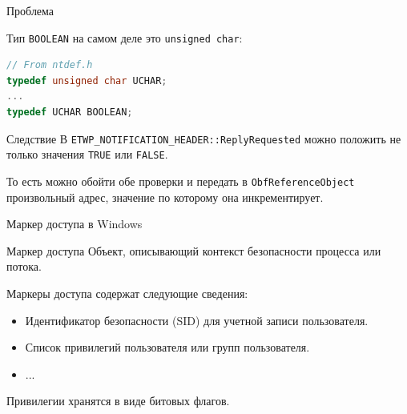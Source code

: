 \documentclass{beamer}
\begin{document}
\begin{frame}[fragile]{Проблема}
    
    Тип \texttt{BOOLEAN} на самом деле это \texttt{unsigned char}:
    
    \begin{lstlisting}[language=C]
// From ntdef.h
typedef unsigned char UCHAR;
...
typedef UCHAR BOOLEAN;\end{lstlisting}

    \begin{block}{Следствие}
        В \texttt{ETWP\_NOTIFICATION\_HEADER::ReplyRequested} можно положить не только значения \texttt{TRUE} или \texttt{FALSE}.
        
        То есть можно обойти обе проверки и передать в \texttt{ObfReferenceObject} произвольный адрес, значение по которому она инкрементирует.
    \end{block}
    
\end{frame}

\begin{frame}{Маркер доступа в Windows}
    
    \begin{alertblock}{Маркер доступа}
        Объект, описывающий контекст безопасности процесса или потока.
    \end{alertblock}
    
    Маркеры доступа содержат следующие сведения:
    \begin{itemize}
        \item Идентификатор безопасности (SID) для учетной записи пользователя.
        \item Список привилегий пользователя или групп пользователя.
        \item ...
    \end{itemize}
    
    Привилегии хранятся в виде битовых флагов.
    
\end{frame}
\end{document}

